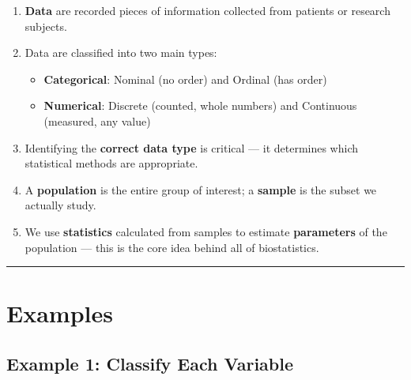 \documentclass[
  12pt,
  letterpaper,
]{book}
\providecommand{\tightlist}{%
  \setlength{\itemsep}{0pt}\setlength{\parskip}{0pt}}
\begin{document}
\begin{tcolorbox}[enhanced jigsaw, arc=.35mm, bottomrule=.15mm, bottomtitle=1mm, breakable, colback=white, colbacktitle=quarto-callout-note-color!10!white, colframe=quarto-callout-note-color-frame, coltitle=black, left=2mm, leftrule=.75mm, opacityback=0, opacitybacktitle=0.6, rightrule=.15mm, title={📝 Chapter 1 Summary}, titlerule=0mm, toprule=.15mm, toptitle=1mm]

\begin{enumerate}
\def\labelenumi{\arabic{enumi}.}
\item
  \textbf{Data} are recorded pieces of information collected from
  patients or research subjects.
\item
  Data are classified into two main types:

  \begin{itemize}
  \tightlist
  \item
    \textbf{Categorical}: Nominal (no order) and Ordinal (has order)
  \item
    \textbf{Numerical}: Discrete (counted, whole numbers) and Continuous
    (measured, any value)
  \end{itemize}
\item
  Identifying the \textbf{correct data type} is critical --- it
  determines which statistical methods are appropriate.
\item
  A \textbf{population} is the entire group of interest; a
  \textbf{sample} is the subset we actually study.
\item
  We use \textbf{statistics} calculated from samples to estimate
  \textbf{parameters} of the population --- this is the core idea behind
  all of biostatistics.
\end{enumerate}

\end{tcolorbox}

\begin{center}\rule{0.5\linewidth}{0.5pt}\end{center}


\chapter{Examples}\label{examples}

\section{Example 1: Classify Each
Variable}\label{example-1-classify-each-variable}
\end{document}

